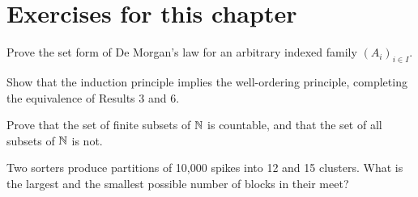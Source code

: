 \section*{Exercises for this chapter}
\begin{exercise}
Prove the set form of De Morgan's law for an arbitrary indexed family
$(A_i)_{i\in I}$.
\end{exercise}
\begin{exercise}
Show that the induction principle implies the well-ordering principle,
completing the equivalence of Results 3 and 6.
\end{exercise}
\begin{exercise}
Prove that the set of finite subsets of $\mathbb{N}$ is countable, and that
the set of all subsets of $\mathbb{N}$ is not.
\end{exercise}
\begin{exercise}
Two sorters produce partitions of 10{,}000 spikes into 12 and 15
clusters. What is the largest and the smallest possible number of
blocks in their meet?
\end{exercise}
